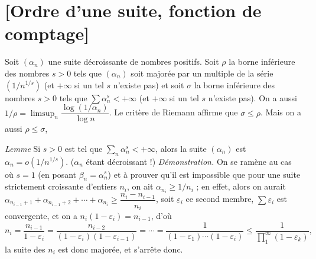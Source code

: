 \documentclass[11pt,a4paper]{article}
\begin{document}
\section{[Ordre d'une suite, fonction de comptage]}


Soit $(\alpha_n)$ une suite décroissante  de nombres positifs. Soit $\rho$ la borne inférieure des nombres $s > 0$ tels que $(\alpha_n)$ soit majorée par un multiple de la série $(1/n^{1/s})$ (et $+\infty$ si un tel $s$ n'existe pas) et soit $\sigma$ la borne inférieure des nombres $s > 0$ tels que $\sum \alpha_n^s < +\infty$ (et $+\infty$ si un tel $s$ n'existe pas). On a aussi $1/\rho = \limsup_n \dfrac{\log(1/\alpha_n)}{\log n}$.   Le critère de Riemann affirme que \struck{$\rho \leq \sigma$} $\sigma \leq \rho$. Mais on a aussi $\rho \leq \sigma$, 

\emph{Lemme} Si $s > 0$ est tel que $\sum_n \alpha_n^s < +\infty$, alors la suite $(\alpha_n)$ est  $\alpha_n = o(1/n^{1/s})$. ($\alpha_n$ étant décroissant !) \emph{Démonstration.} On se ramène au cas où $s = 1$ (en posant $\beta_n = \alpha_n^s$) et à prouver qu'il est impossible que \struck{\ill{}} pour une suite strictement croissante d'entiers $n_i$, on ait $\alpha_{n_i} \geq 1/n_i$ ; en effet, alors on aurait $\alpha_{n_{i-1}+1} + \alpha_{n_{i-1}+2} + \cdots + \alpha_{n_i} \geq \dfrac{n_i - n_{i-1}}{n_i}$, soit $\varepsilon_i$ ce second membre, $\sum \varepsilon_i$ est  convergente, et on a $n_i(1 - \varepsilon_i) = n_{i-1}$, d'où
\[
  n_i = \frac{n_{i-1}}{1 - \varepsilon_i} = \frac{n_{i-2}}{(1 - \varepsilon_i)(1 - \varepsilon_{i-1})} = \cdots = \frac{1}{(1 - \varepsilon_1)\cdots(1 - \varepsilon_i)} \leq \frac{1}{\prod_1^{\infty} (1 - \varepsilon_k)},
\]
 la suite des $n_i$ est donc majorée, \struck{\ill{}} et s'arrête donc.
\end{document}
